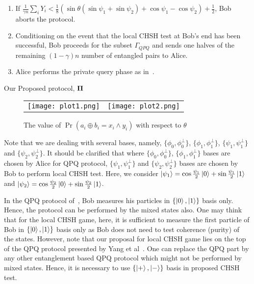 \documentclass[twocolumn,pra,aps,amssymb]{revtex4}
\begin{document}
\begin{algorithm}[htbp]
{\begin{enumerate}
\hspace{5pt} (e) Testing: For the test round $i \in \Gamma_{CHSH}$, define 
  \begin{eqnarray*}
  Y_i=
  \begin{cases}
   1 & \text{if } a_i\oplus b_i=x_i \wedge {y_i}\\
   0 & \text{if } otherwise.
  \end{cases}
 \end{eqnarray*} 
 \item If 
 $\frac{1}{\gamma n}\sum_i {Y_i} 
 < \frac{1}{8}(\sin{\theta}(\sin\psi_1+\sin\psi_2)+\cos\psi_1-\cos\psi_2)+\frac{1}{2}$,
  Bob aborts the protocol. 
  \item Conditioning on the event that the local CHSH test at Bob's end has been successful, Bob proceeds for the subset $\Gamma_{QPQ}$ and sends one halves of the remaining $(1-\gamma) n$ number of entangled pairs to Alice.  
 \item Alice performs the private query phase as in~\cite{Yang}.
 \end{enumerate}
}
\caption{Our Proposed protocol, $\bf \Pi$}
\end{algorithm}

\begin{figure*}[htbp]
\centering
\begin{tabular}{cc}
\texttt{[image: plot1.png]}
& 
\texttt{[image: plot2.png]}
\end{tabular}
\caption{The value of $\Pr(a_i\oplus b_i=x_i\wedge y_i)$ with respect to $\theta$}
\label{plot}
\end{figure*}


Note that we are dealing with several bases, namely, $\{\phi_0,\phi_0^{\perp}\}$, $\{\phi_1,\phi_1^{\perp}\}$, $\{\psi_1,\psi_1^{\perp}\}$ and $\{\psi_2,\psi_2^{\perp}\}$. It should be clarified that where $\{\phi_0,\phi_0^{\perp}\}$, $\{\phi_1,\phi_1^{\perp}\}$ bases are chosen by Alice for QPQ protocol, $\{\psi_1,\psi_1^{\perp}\}$ and $\{\psi_2,\psi_2^{\perp}\}$ bases are chosen by Bob to perform local CHSH test. Here, we consider {\bf{$\left|\psi_1\right\rangle=\cos{\frac{\psi_1}{2}}\left|0\right\rangle+\sin{\frac{\psi_1}{2}}\left|1\right\rangle$}} and {\bf {$\left|\psi_2\right\rangle=\cos{\frac{\psi_2}{2}}\left|0\right\rangle+\sin{\frac{\psi_2}{2}}\left|1\right\rangle$}}.

In the QPQ protocol of~\cite{Yang}, Bob measures his particles in $\{\left|0\right\rangle,\left|1\right\rangle\}$ basis only. Hence, the protocol can be performed by the mixed states also. One may think that for the local CHSH game, here, it is sufficient to measure the first particle of Bob in $\{\left|0\right\rangle,\left|1\right\rangle\}$ basis only as Bob does not need to test coherence (purity) of the states. However, note that our proposal for local CHSH game lies on the top of the QPQ protocol presented by Yang et al~\cite{Yang}. One can replace the QPQ part by any other entanglement based QPQ protocol which might not be performed by mixed states. Hence, it is necessary to use $\{\left|+\right\rangle,\left|-\right\rangle\}$ basis in proposed CHSH test.    
\end{document}

